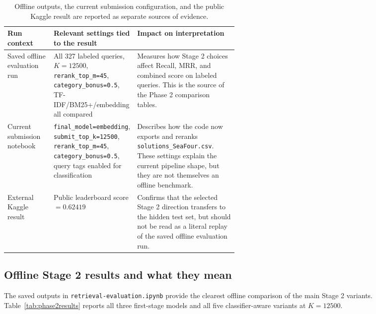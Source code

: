 \documentclass[11pt,a4paper]{article}
\begin{document}
\begin{table}[H]
\centering
\small
\begin{tabularx}{\linewidth}{p{0.20\linewidth}p{0.34\linewidth}Y}
\toprule
Run context & Relevant settings tied to the result & Impact on interpretation \\
\midrule
Saved offline evaluation run & All 327 labeled queries, \(K=12500\), \texttt{rerank\_top\_m=45}, \texttt{category\_bonus=0.5}, TF-IDF/BM25+/embedding all compared & Measures how Stage 2 choices affect Recall, MRR, and combined score on labeled queries. This is the source of the Phase 2 comparison tables. \\
Current submission notebook & \texttt{final\_model=embedding}, \texttt{submit\_top\_k=12500}, \texttt{rerank\_top\_m=45}, \texttt{category\_bonus=0.5}, query tags enabled for classification & Describes how the code now exports and reranks \texttt{solutions\_SeaFour.csv}. These settings explain the current pipeline shape, but they are not themselves an offline benchmark. \\
External Kaggle result & Public leaderboard score \(=0.62419\) & Confirms that the selected Stage 2 direction transfers to the hidden test set, but should not be read as a literal replay of the saved offline evaluation run. \\
\bottomrule
\end{tabularx}
\caption{Offline outputs, the current submission configuration, and the public Kaggle result are reported as separate sources of evidence.}
\label{tab:runcontexts}
\end{table}

\subsection{Offline Stage 2 results and what they mean}

The saved outputs in \texttt{retrieval-evaluation.ipynb} provide the clearest offline comparison of the main Stage 2 variants. Table~\ref{tab:phase2results} reports all three first-stage models and all five classifier-aware variants at \(K=12500\).
\end{document}

